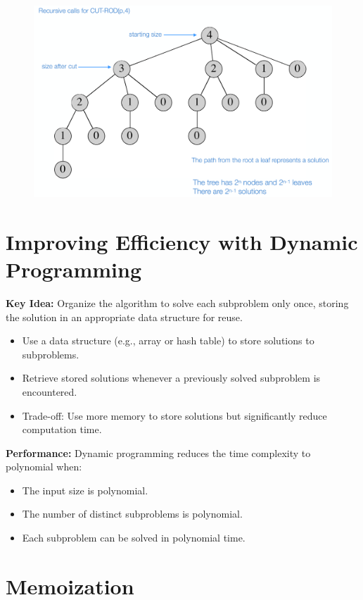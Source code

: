 \begin{figure}[h!]
    \centering
    \includegraphics[width=1\linewidth]{immagini//capitolo 13/13_3.png}
    \label{CUT}
\end{figure}

\section{Improving Efficiency with Dynamic Programming}

\textbf{Key Idea:} Organize the algorithm to solve each subproblem only once, storing the solution in an appropriate data structure for reuse.

\begin{itemize}
    \item Use a data structure (e.g., array or hash table) to store solutions to subproblems.
    \item Retrieve stored solutions whenever a previously solved subproblem is encountered.
    \item Trade-off: Use more memory to store solutions but significantly reduce computation time.
\end{itemize}
\textbf{Performance:} Dynamic programming reduces the time complexity to polynomial when:
\begin{itemize}
    \item The input size is polynomial.
    \item The number of distinct subproblems is polynomial.
    \item Each subproblem can be solved in polynomial time.
\end{itemize}


\section{Memoization}

